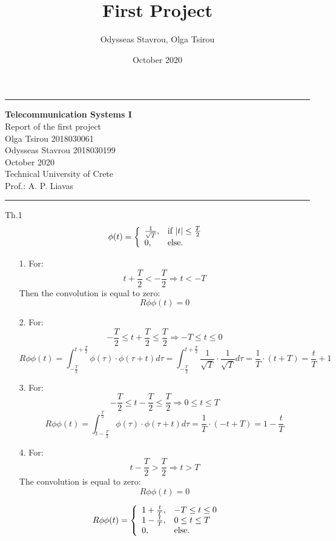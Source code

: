 \documentclass[12pt, a4paper]{article}
\title{First Project}
\author{Odysseas Stavrou, Olga Tsirou}
\date{October 2020}
\begin{document}
\noindent\rule{\textwidth}{1.5pt}

\begin{center}
{\bf Telecommunication Systems I} \\ 
 Report of the first project\\
 Olga Tsirou 2018030061\\
 Odysseas Stavrou 2018030199\\
 October 2020\\
 Technical University of Crete\\
 Prof.: A. P. Liavas 
\end{center}
\noindent\rule{\textwidth}{1.5pt}

Th.1
\[
\phi(t) = \left\{
\begin{array}{ll} 
\frac{1}{\sqrt{T}}, & \mbox{if}~|t|\le \frac{T}{2}\cr
0, & \mbox{else.}
\end{array} \right.
\]

\begin{enumerate}

\item[1.]
For: \[t +\frac{T}{2} < -\frac{T}{2}\Rightarrow t < -T\]
Then the convolution is equal to zero: \[R\phi\phi(t) = 0\]
\item[2.]
For: \[-\frac{T}{2} \le t + \frac{T}{2} \le \frac{T}{2} \Rightarrow -T \le t \le 0\] 
\[R\phi\phi(t) = \int_{-\frac{T}{2}}^{t + \frac{T}{2}} \phi(\tau) \cdot \phi(\tau + t)d\tau
= \int_{-\frac{T}{2}}^{t + \frac{T}{2}} \frac{1}{\sqrt{T}} \cdot \frac{1}{\sqrt{T}}d\tau = \frac{1}{T} \cdot (t + T) = \boxed{\frac{t}{T} + 1}
\]
\item[3.]
For: \[-\frac{T}{2} \le t - \frac{T}{2} \le \frac{T}{2} \Rightarrow 0 \le t \le T\]
\[R\phi\phi(t) = \int_{t-\frac{T}{2}}^{\frac{T}{2}} \phi(\tau) \cdot \phi(\tau + t)d\tau
= \frac{1}{T} \cdot (-t+T) = \boxed{1 - \frac{t}{T}}
\]
\item[4.]
For: \[t - \frac{T}{2} > \frac{T}{2} \Rightarrow t > T\]
The convolution is equal to zero:
\[R\phi\phi(t) = 0\]

\end{enumerate}
\[
R\phi\phi(t) = \left\{
\begin{array}{ll} 
1 + \frac{t}{T}, & -T \le t \le 0 \cr
1 - \frac{t}{T}, & 0\le t \le T\cr
0, & \mbox{else.}
\end{array} \right.
\]
\end{document}
